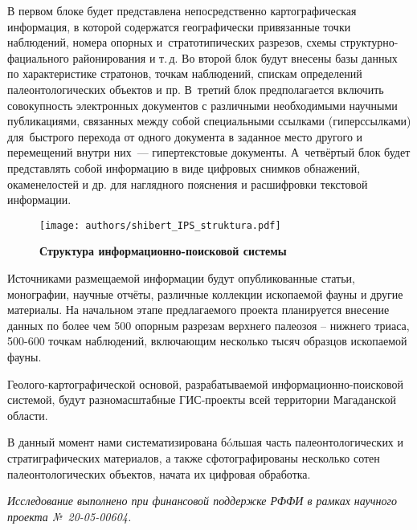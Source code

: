 В первом блоке будет представлена непосредственно картографическая информация, в которой содержатся географически привязанные точки наблюдений, номера опорных и~стратотипических разрезов, схемы структурно-фациального районирования и т.\,д. Во второй блок будут внесены базы данных по характеристике стратонов, точкам наблюдений, спискам определений палеонтологических объектов и пр. В~третий блок предполагается включить совокупность электронных документов с различными необходимыми научными публикациями, связанных между собой специальными ссылками (гиперссылками) для~быстрого перехода от одного документа в заданное место другого и перемещений внутри них~--- гипертекстовые документы. А~четвёртый блок будет представлять собой информацию в виде цифровых снимков обнажений, окаменелостей и др. для наглядного пояснения и расшифровки текстовой информации.\enlargethispage{\baselineskip}

\begin{figure}[H]
  \centering
  \texttt{[image: authors/shibert\_IPS\_struktura.pdf]}
  \caption*{\textbf{Структура информационно-поисковой системы}}
  \label{fig:shibert_IPS_struktura.pdf}
\end{figure}



Источниками размещаемой информации будут опубликованные статьи, монографии, научные отчёты, различные коллекции ископаемой фауны и другие материалы. На начальном этапе предлагаемого проекта планируется внесение данных по более чем 500 опорным разрезам верхнего палеозоя -- нижнего триаса, 500-600 точкам наблюдений, включающим несколько тысяч образцов ископаемой фауны.

Геолого-картографической основой, разрабатываемой информационно-поисковой системой, будут разномасштабные ГИС-проекты всей территории Магаданской области.

В данный момент нами систематизирована бóльшая часть палеонтологических и стратиграфических материалов, а также сфотографированы несколько сотен палеонтологических объектов, начата их цифровая обработка.

\textit{Исследование выполнено при финансовой поддержке РФФИ в рамках научного проекта №~20-05-00604.}


